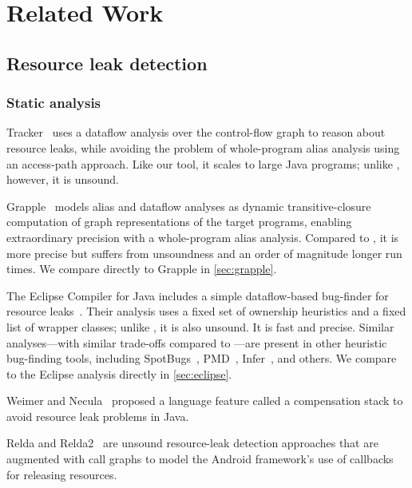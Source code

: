 \section{Related Work}
\label{sec:relatedwork}

\subsection{Resource leak detection}
\label{sec:rw-resource-leaks}



\subsubsection{Static analysis}

Tracker~\cite{TorlakC10} uses a dataflow analysis over the control-flow
graph to reason about resource leaks, while avoiding the problem of
whole-program alias analysis using an access-path approach. Like our tool,
it scales to large Java programs; unlike \tool, however, it is unsound.

Grapple~\cite{zuo2019grapple} models alias and dataflow analyses as
dynamic transitive-closure computation of graph representations of
the target programs, enabling extraordinary precision with a whole-program
alias analysis. Compared to \tool, it is more precise but suffers
from unsoundness and an order of magnitude longer run times.
We compare directly to Grapple in \cref{sec:grapple}.

The Eclipse Compiler for Java includes a simple dataflow-based
bug-finder for resource leaks~\cite{ecj-resource-leak}. Their analysis
uses a fixed set of ownership heuristics and a fixed list of wrapper
classes; unlike \tool, it is also unsound. It is fast and
 precise.  Similar analyses---with similar trade-offs
compared to \tool---are present in other heuristic bug-finding tools,
including SpotBugs~\cite{spotbugs-resource-leak},
PMD~\cite{pmd-resource-leak}, Infer~\cite{infer-resource-leak}, and others.
We compare to the Eclipse analysis directly in \cref{sec:eclipse}.

Weimer and Necula~\cite{WeimerN04} proposed a language feature called
a compensation stack to avoid resource leak problems in Java.

Relda and Relda2~\cite{guo2013characterizing,wu2016relda2} are unsound
resource-leak detection approaches that are augmented with call graphs
to model the Android framework's use of callbacks for releasing
resources.

